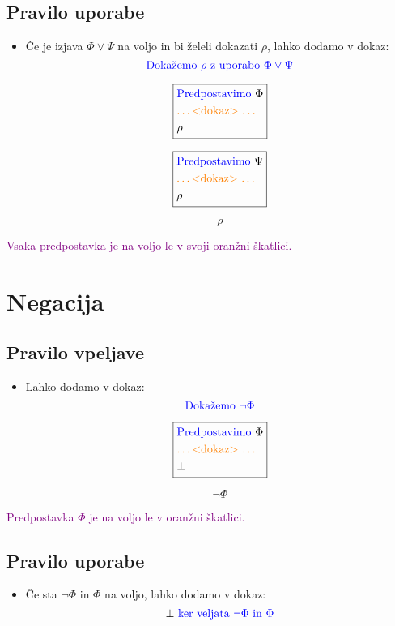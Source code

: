 \documentclass[12pt,a4paper]{article}
\newcommand{\blue}[1]{\textcolor{blue}{#1}}
\newcommand{\orange}[1]{\textcolor{orange}{#1}}
\newcommand{\purple}[1]{\textcolor{purple}{#1}}
\newcommand{\dokaz}{\orange{\text{\ldots <dokaz> \ldots}}}
\newcommand{\skatlica}[1]{
    \begin{equation*}
        \boxed{
        \begin{aligned}
            #1
        \end{aligned}
        }
    \end{equation*}
}
\begin{document}
    \subsection*{Pravilo uporabe}
    \begin{itemize}
        \item Če je izjava $ \Phi \vee \Psi $ na voljo in bi želeli dokazati $ \rho $, lahko dodamo v dokaz:
        $$ \blue{\text{Dokažemo } \rho \text{ z uporabo } \Phi \vee \Psi } $$
        \skatlica{
            &\blue{\text{Predpostavimo }} \Phi \\
            &\orange{\text{\ldots <dokaz> \ldots}} \\
            &\rho 
        }
        \skatlica{
            &\blue{\text{Predpostavimo }} \Psi \\
            &\orange{\text{\ldots <dokaz> \ldots}} \\
            &\rho 
        }
        $$ \rho $$
    \end{itemize}
    \noindent \purple{Vsaka predpostavka je na voljo le v svoji oranžni škatlici.}

\section{Negacija}
    \subsection*{Pravilo vpeljave}
    \begin{itemize}
        \item Lahko dodamo v dokaz:
        $$   \blue{\text{Dokažemo } \neg \Phi  }   $$
        \skatlica{
            &\blue{\text{Predpostavimo }} \Phi \\
            &\dokaz \\
            &\bot 
        }
        $$ \neg \Phi $$
    \end{itemize}
    \purple{Predpostavka $ \Phi $ je na voljo le v oranžni škatlici.}

    \subsection{Pravilo uporabe}
    \begin{itemize}
        \item Če sta $ \neg \Phi $ in $ \Phi  $ na voljo, lahko dodamo v dokaz:
        $$  \bot \blue{\text{ ker veljata } \neg \Phi \text{ in } \Phi } $$
    \end{itemize}
\end{document}
